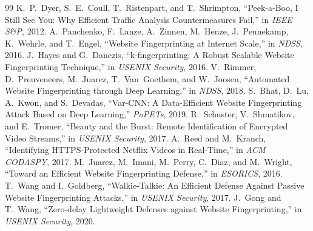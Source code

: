 \documentclass[journal]{IEEEtran}
\begin{document}
\begin{thebibliography}{99}
 K.~P.~Dyer, S.~E.~Coull, T.~Ristenpart, and T.~Shrimpton, ``Peek-a-Boo, I Still See You: Why Efficient Traffic Analysis Countermeasures Fail,'' in \emph{IEEE S\&P}, 2012.
 A.~Panchenko, F.~Lanze, A.~Zinnen, M.~Henze, J.~Pennekamp, K.~Wehrle, and T.~Engel, ``Website Fingerprinting at Internet Scale,'' in \emph{NDSS}, 2016.
 J.~Hayes and G.~Danezis, ``k-fingerprinting: A Robust Scalable Website Fingerprinting Technique,'' in \emph{USENIX Security}, 2016.
 V.~Rimmer, D.~Preuveneers, M.~Juarez, T.~Van~Goethem, and W.~Joosen, ``Automated Website Fingerprinting through Deep Learning,'' in \emph{NDSS}, 2018.
 S.~Bhat, D.~Lu, A.~Kwon, and S.~Devadas, ``Var-CNN: A Data-Efficient Website Fingerprinting Attack Based on Deep Learning,'' \emph{PoPETs}, 2019.
 R.~Schuster, V.~Shmatikov, and E.~Tromer, ``Beauty and the Burst: Remote Identification of Encrypted Video Streams,'' in \emph{USENIX Security}, 2017.
 A.~Reed and M.~Kranch, ``Identifying HTTPS-Protected Netflix Videos in Real-Time,'' in \emph{ACM CODASPY}, 2017.
 M.~Juarez, M.~Imani, M.~Perry, C.~Diaz, and M.~Wright, ``Toward an Efficient Website Fingerprinting Defense,'' in \emph{ESORICS}, 2016.
 T.~Wang and I.~Goldberg, ``Walkie-Talkie: An Efficient Defense Against Passive Website Fingerprinting Attacks,'' in \emph{USENIX Security}, 2017.
 J.~Gong and T.~Wang, ``Zero-delay Lightweight Defenses against Website Fingerprinting,'' in \emph{USENIX Security}, 2020.
\end{thebibliography}
\end{document}
